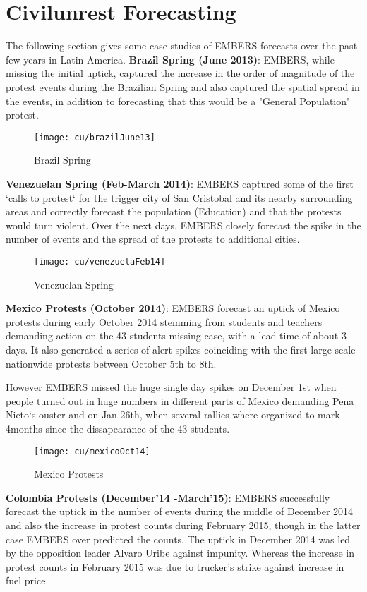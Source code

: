 \section{Civilunrest Forecasting}
The following section gives some case studies of EMBERS forecasts over
the past few years in Latin America.
\textbf{Brazil Spring (June 2013)}:
EMBERS, while missing the initial uptick, captured the increase in the order of
magnitude of the protest events during the Brazilian Spring and also captured
the spatial spread in the events, in addition to forecasting that this would be
a "General Population" protest.
\begin{figure}[H]
\texttt{[image: cu/brazilJune13]}
\caption{Brazil Spring}
\label{fig:brazilJune13}
\end{figure}


\textbf{Venezuelan Spring (Feb-March 2014)}:
EMBERS captured some of the first `calls to protest` for the trigger city of
San Cristobal and its nearby surrounding areas and correctly forecast the
population (Education) and that the protests would turn violent. Over the next
days, EMBERS closely forecast the spike in the number of events and the spread
of the protests to additional cities.
   
\begin{figure}[H]
\texttt{[image: cu/venezuelaFeb14]}
\caption{Venezuelan Spring}
\label{fig:venezuelaMarch14}
\end{figure}

\textbf{Mexico Protests (October 2014)}:
EMBERS forecast an uptick of Mexico protests during early October 2014 stemming
from students and teachers demanding action on the 43 students missing
case, with a lead time of about 3
days. It also generated  a series of alert spikes coinciding with the first
large-scale nationwide protests between October 5th to 8th.

However EMBERS missed the huge single day spikes on December 1st when
people turned out in huge numbers in different parts of Mexico demanding
Pena Nieto`s ouster and on Jan 26th, when several rallies where
organized to mark 4months since the dissapearance of the 43 students.
\begin{figure}[H]
\texttt{[image: cu/mexicoOct14]}
\caption{Mexico Protests}
\label{fig:mexicoOct14}
\end{figure}

\textbf{Colombia Protests (December'14 -March'15)}:
EMBERS successfully forecast the uptick in the number of events during the
middle of December 2014 and also the increase in protest counts during February
2015, though in the latter case EMBERS over predicted the counts. The uptick in
December 2014 was led by the opposition leader Alvaro Uribe against impunity.
Whereas the increase in  protest counts in February 2015
was due to trucker’s strike against increase in fuel price.

